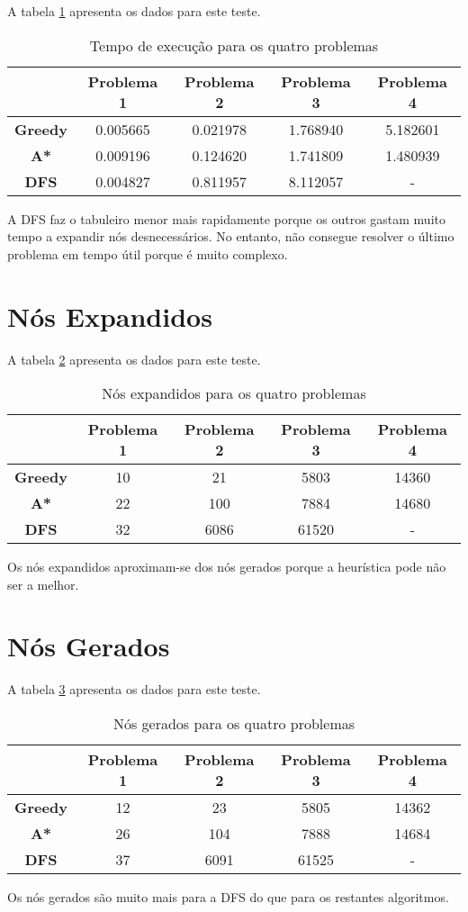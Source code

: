 \documentclass[12pt,a4paper]{article}
\begin{document}
A tabela \ref{te} apresenta os dados para este teste.

\begin{table}[ht]
	\centering
	\begin{tabular}{c|c|c|c|c}
		\multicolumn{1}{r|}{} & \textbf{Problema 1} & \textbf{Problema 2} & \textbf{Problema 3} & \textbf{Problema 4} \\ \hline
		\textbf{Greedy} & 0.005665  & 0.021978 & 1.768940  & 5.182601 \\ \hline
		\textbf{A*} & 0.009196 & 0.124620  & 1.741809 & 1.480939 \\\hline
		\textbf{DFS}  & 0.004827 & 0.811957  & 8.112057  & -
	\end{tabular}
	\caption{Tempo de execução para os quatro problemas}
	\label{te}
\end{table}

A DFS faz o tabuleiro menor mais rapidamente porque os outros
gastam muito tempo a expandir nós desnecessários. No entanto,
não consegue resolver o último problema em tempo útil porque é
muito complexo.

\section{Nós Expandidos}

A tabela \ref{ne} apresenta os dados para este teste.

\begin{table}[ht]
	\centering
	\begin{tabular}{c|c|c|c|c}
		\multicolumn{1}{r|}{} & \textbf{Problema 1} & \textbf{Problema 2} & \textbf{Problema 3} & \textbf{Problema 4} \\ \hline
		\textbf{Greedy} & 10 & 21 & 5803 & 14360 \\ \hline
		\textbf{A*} & 22 & 100 & 7884 & 14680 \\ \hline
		\textbf{DFS} & 32 & 6086 & 61520 & -
	\end{tabular}
	\caption{Nós expandidos para os quatro problemas}
	\label{ne}
\end{table}

Os nós expandidos aproximam-se dos nós gerados porque a heurística pode
não ser a melhor.

\section{Nós Gerados}
A tabela \ref{ng} apresenta os dados para este teste.

\begin{table}[ht]
	\centering
	\begin{tabular}{c|c|c|c|c}
		\multicolumn{1}{r|}{} & \textbf{Problema 1} & \textbf{Problema 2} & \textbf{Problema 3} & \textbf{Problema 4} \\ \hline
		\textbf{Greedy} & 12 & 23 & 5805 & 14362 \\ \hline
		\textbf{A*} & 26 & 104 & 7888 & 14684 \\ \hline
		\textbf{DFS} & 37 & 6091 & 61525 & -
	\end{tabular}
	\caption{Nós gerados para os quatro problemas}
	\label{ng}
\end{table}

Os nós gerados são muito mais para a DFS do que para os restantes algoritmos.
\end{document}

